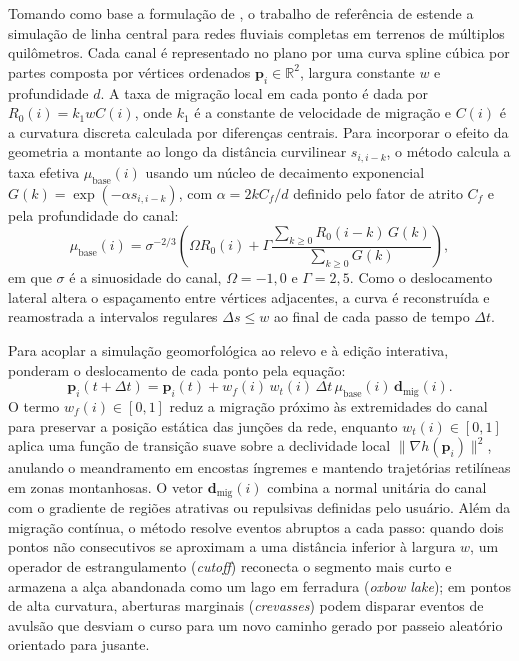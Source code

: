 \documentclass[9pt,a4paper,twocolumn]{extarticle}
\begin{document}
Tomando como base a formulação de \textcite{sylvester2019high}, o trabalho de referência de \textcite{paris2023meandering} estende a simulação de linha central para redes fluviais completas em terrenos de múltiplos quilômetros. Cada canal é representado no plano por uma curva spline cúbica por partes composta por vértices ordenados $\mathbf{p}_i \in \mathbb{R}^2$, largura constante $w$ e profundidade $d$. A taxa de migração local em cada ponto é dada por $R_0(i) = k_1 w C(i)$, onde $k_1$ é a constante de velocidade de migração e $C(i)$ é a curvatura discreta calculada por diferenças centrais. Para incorporar o efeito da geometria a montante ao longo da distância curvilinear $s_{i, i-k}$, o método calcula a taxa efetiva $\mu_{\text{base}}(i)$ usando um núcleo de decaimento exponencial $G(k) = \exp(-\alpha s_{i,i-k})$, com $\alpha = 2 k C_f / d$ definido pelo fator de atrito $C_f$ e pela profundidade do canal:
\begin{equation}
    \mu_{\text{base}}(i) = \sigma^{-2/3} \left( \Omega R_0(i) + \Gamma \frac{\sum_{k \ge 0} R_0(i-k) \, G(k)}{\sum_{k \ge 0} G(k)} \right),
    \label{eq:total_migration}
\end{equation}
em que $\sigma$ é a sinuosidade do canal, $\Omega = -1{,}0$ e $\Gamma = 2{,}5$. Como o deslocamento lateral altera o espaçamento entre vértices adjacentes, a curva é reconstruída e reamostrada a intervalos regulares $\Delta s \le w$ ao final de cada passo de tempo $\Delta t$.

Para acoplar a simulação geomorfológica ao relevo e à edição interativa, \textcite{paris2023meandering} ponderam o deslocamento de cada ponto pela equação:
\begin{equation}
    \mathbf{p}_i(t + \Delta t) = \mathbf{p}_i(t) + w_f(i) \, w_t(i) \, \Delta t \, \mu_{\text{base}}(i) \, \mathbf{d}_{\text{mig}}(i).
    \label{eq:baseline_step}
\end{equation}
O termo $w_f(i) \in [0, 1]$ reduz a migração próximo às extremidades do canal para preservar a posição estática das junções da rede, enquanto $w_t(i) \in [0, 1]$ aplica uma função de transição suave sobre a declividade local $\|\nabla h(\mathbf{p}_i)\|^2$, anulando o meandramento em encostas íngremes e mantendo trajetórias retilíneas em zonas montanhosas. O vetor $\mathbf{d}_{\text{mig}}(i)$ combina a normal unitária do canal com o gradiente de regiões atrativas ou repulsivas definidas pelo usuário. Além da migração contínua, o método resolve eventos abruptos a cada passo: quando dois pontos não consecutivos se aproximam a uma distância inferior à largura $w$, um operador de estrangulamento (\textit{cutoff}) reconecta o segmento mais curto e armazena a alça abandonada como um lago em ferradura (\textit{oxbow lake}); em pontos de alta curvatura, aberturas marginais (\textit{crevasses}) podem disparar eventos de avulsão que desviam o curso para um novo caminho gerado por passeio aleatório orientado para jusante.
\end{document}
